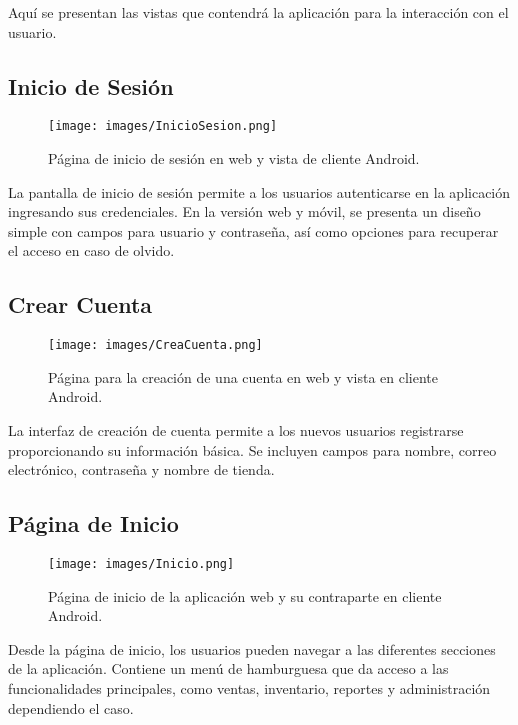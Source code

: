 Aquí se presentan las vistas que contendrá la aplicación para la interacción con el usuario.

\subsection{Inicio de Sesión}

\begin{figure}[H]
    \texttt{[image: images/InicioSesion.png]}
    \centering
    \caption{Página de inicio de sesión en web y vista de cliente Android.}
\end{figure}

La pantalla de inicio de sesión permite a los usuarios autenticarse en la aplicación ingresando sus credenciales.
En la versión web y móvil, se presenta un diseño simple con campos para usuario y contraseña, así como opciones para 
recuperar el acceso en caso de olvido.


\subsection{Crear Cuenta}

\begin{figure}[H]
    \texttt{[image: images/CreaCuenta.png]}
    \centering
    \caption{Página para la creación de una cuenta en web y vista en cliente Android.}
\end{figure}

La interfaz de creación de cuenta permite a los nuevos usuarios registrarse proporcionando su información básica.
Se incluyen campos para nombre, correo electrónico, contraseña y nombre de tienda.

\subsection{Página de Inicio}

\begin{figure}[H]
    \texttt{[image: images/Inicio.png]}
    \centering
    \caption{Página de inicio de la aplicación web y su contraparte en cliente Android.}
\end{figure}

Desde la página de inicio, los usuarios pueden navegar a las diferentes secciones de la aplicación. Contiene un menú de
hamburguesa que da acceso a las funcionalidades principales, como ventas, inventario, reportes y administración dependiendo el caso.

